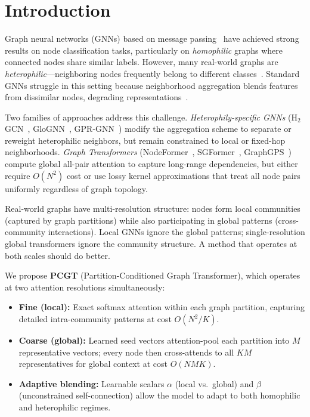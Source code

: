 \section{Introduction}

Graph neural networks (GNNs) based on message passing~\citep{gilmer2017mpnn, kipf2017semi, scarselli2009gnn} have achieved strong results on node classification tasks, particularly on \emph{homophilic} graphs where connected nodes share similar labels. However, many real-world graphs are \emph{heterophilic}---neighboring nodes frequently belong to different classes~\citep{zhu2020h2gcn, pei2020geomgcn}. Standard GNNs struggle in this setting because neighborhood aggregation blends features from dissimilar nodes, degrading representations~\citep{li2018oversmoothing}.

Two families of approaches address this challenge. \emph{Heterophily-specific GNNs} (H$_2$GCN~\citep{zhu2020h2gcn}, GloGNN~\citep{li2022glognn}, GPR-GNN~\citep{chien2021gprgnn}) modify the aggregation scheme to separate or reweight heterophilic neighbors, but remain constrained to local or fixed-hop neighborhoods. \emph{Graph Transformers} (NodeFormer~\citep{wu2022nodeformer}, SGFormer~\citep{wu2023sgformer}, GraphGPS~\citep{rampasek2022graphgps}) compute global all-pair attention to capture long-range dependencies, but either require $O(N^2)$ cost or use lossy kernel approximations that treat all node pairs uniformly regardless of graph topology.

Real-world graphs have multi-resolution structure: nodes form local communities (captured by graph partitions) while also participating in global patterns (cross-community interactions). Local GNNs ignore the global patterns; single-resolution global transformers ignore the community structure. A method that operates at both scales should do better.

We propose \textbf{PCGT} (Partition-Conditioned Graph Transformer), which operates at two attention resolutions simultaneously:
\begin{itemize}
\item \textbf{Fine (local):} Exact softmax attention within each graph partition, capturing detailed intra-community patterns at cost $O(N^2/K)$.
\item \textbf{Coarse (global):} Learned seed vectors attention-pool each partition into $M$ representative vectors; every node then cross-attends to all $KM$ representatives for global context at cost $O(NMK)$.
\item \textbf{Adaptive blending:} Learnable scalars $\alpha$ (local vs.\ global) and $\beta$ (unconstrained self-connection) allow the model to adapt to both homophilic and heterophilic regimes.
\end{itemize}

